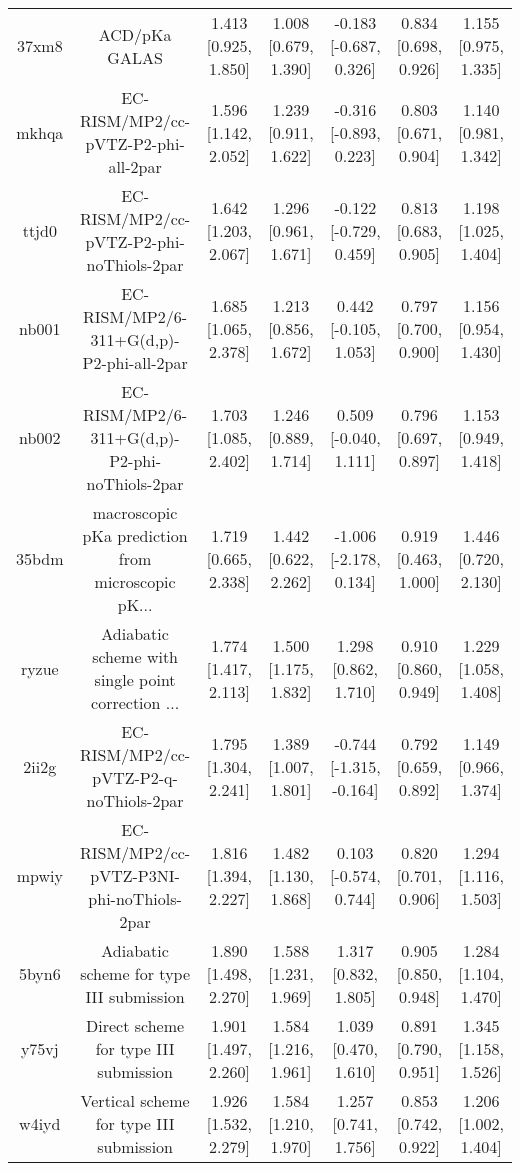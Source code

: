 \documentclass{article}
\begin{document}
\begin{center}
\begin{longtable}{|ccccccc|}
 37xm8 &                                      ACD/pKa GALAS &    1.413 [0.925, 1.850] &   1.008 [0.679, 1.390] &    -0.183 [-0.687, 0.326] &  0.834 [0.698, 0.926] &    1.155 [0.975, 1.335] \\
 mkhqa &                EC-RISM/MP2/cc-pVTZ-P2-phi-all-2par &    1.596 [1.142, 2.052] &   1.239 [0.911, 1.622] &    -0.316 [-0.893, 0.223] &  0.803 [0.671, 0.904] &    1.140 [0.981, 1.342] \\
 ttjd0 &           EC-RISM/MP2/cc-pVTZ-P2-phi-noThiols-2par &    1.642 [1.203, 2.067] &   1.296 [0.961, 1.671] &    -0.122 [-0.729, 0.459] &  0.813 [0.683, 0.905] &    1.198 [1.025, 1.404] \\
 nb001 &           EC-RISM/MP2/6-311+G(d,p)-P2-phi-all-2par &    1.685 [1.065, 2.378] &   1.213 [0.856, 1.672] &     0.442 [-0.105, 1.053] &  0.797 [0.700, 0.900] &    1.156 [0.954, 1.430] \\
 nb002 &      EC-RISM/MP2/6-311+G(d,p)-P2-phi-noThiols-2par &    1.703 [1.085, 2.402] &   1.246 [0.889, 1.714] &     0.509 [-0.040, 1.111] &  0.796 [0.697, 0.897] &    1.153 [0.949, 1.418] \\
 35bdm &  macroscopic pKa prediction from microscopic pK... &    1.719 [0.665, 2.338] &   1.442 [0.622, 2.262] &    -1.006 [-2.178, 0.134] &  0.919 [0.463, 1.000] &    1.446 [0.720, 2.130] \\
 ryzue &  Adiabatic scheme with single point correction ... &    1.774 [1.417, 2.113] &   1.500 [1.175, 1.832] &      1.298 [0.862, 1.710] &  0.910 [0.860, 0.949] &    1.229 [1.058, 1.408] \\
 2ii2g &             EC-RISM/MP2/cc-pVTZ-P2-q-noThiols-2par &    1.795 [1.304, 2.241] &   1.389 [1.007, 1.801] &   -0.744 [-1.315, -0.164] &  0.792 [0.659, 0.892] &    1.149 [0.966, 1.374] \\
 mpwiy &         EC-RISM/MP2/cc-pVTZ-P3NI-phi-noThiols-2par &    1.816 [1.394, 2.227] &   1.482 [1.130, 1.868] &     0.103 [-0.574, 0.744] &  0.820 [0.701, 0.906] &    1.294 [1.116, 1.503] \\
 5byn6 &           Adiabatic scheme for type III submission &    1.890 [1.498, 2.270] &   1.588 [1.231, 1.969] &      1.317 [0.832, 1.805] &  0.905 [0.850, 0.948] &    1.284 [1.104, 1.470] \\
 y75vj &              Direct scheme for type III submission &    1.901 [1.497, 2.260] &   1.584 [1.216, 1.961] &      1.039 [0.470, 1.610] &  0.891 [0.790, 0.951] &    1.345 [1.158, 1.526] \\
 w4iyd &            Vertical scheme for type III submission &    1.926 [1.532, 2.279] &   1.584 [1.210, 1.970] &      1.257 [0.741, 1.756] &  0.853 [0.742, 0.922] &    1.206 [1.002, 1.404] \\

\end{longtable}
\end{center}
\end{document}
